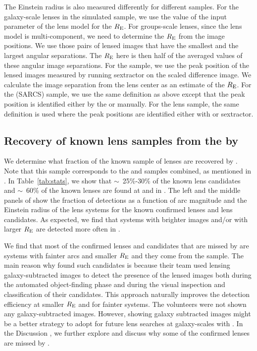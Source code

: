 \documentclass[useAMS,usenatbib,a4paper]{mn2e}
\begin{document}
The Einstein radius is also measured differently for
different samples. For the galaxy-scale lenses in the simulated sample,
we use the value of the input parameter of the lens model for the $R_{\rm E}$.
For groups-scale lenses, since the lens model is multi-component, we
need to determine the $R_{\rm E}$ from the image positions. We use those
pairs of lensed images that have the smallest and the largest angular
separations. The $R_{\rm E}$ here is then half of the averaged values of
these angular image separations. For the \rf sample, we use the peak
position of the lensed images measured by running {\sc sextractor} on
the scaled difference image. We calculate the image separation from the
lens center as an estimate of the $R_{\rm E}$. For the \af (SARCS)
sample, we use the same definition as above except that the peak
position is identified either by the \af or manually. For the \sw lens
sample, the same definition is used where the peak positions are
identified either with \af or {\sc sextractor}.



\subsection{Recovery of known lens samples from the \cfhtls by \sw}
\label{sec:results:known}

We determine what fraction of the known sample of lenses are recovered
by \sw. Note that this sample corresponds to the \rf and \af samples
combined, as mentioned in . In Table~\ref{tab:stats},
we show that $\sim$~25\%-30\% of the known lens candidates and
$\sim$~60\% of the known lenses are found at \StageOne and \StageTwo in
\sw. The left and the middle panels of  show the
fraction of detections as a function of arc magnitude and the Einstein
radius of the lens systems for the known confirmed lenses and lens
candidates. As expected, we find that systems with brighter images
and/or with larger $R_{\rm E}$ are detected more often in \sw.

We find that most of the confirmed lenses and candidates that are missed
by \sw are systems with fainter arcs and smaller $R_{\rm E}$ and they
come from the \rf sample. The main reason why \rf found such candidates
is because their team used lensing galaxy-subtracted images to detect
the presence of the lensed images both during the automated
object-finding phase and during the visual inspection and classification
of their candidates. This approach naturally improves the detection
efficiency at smaller $R_{\rm E}$ and for fainter systems. The \sw
volunteers were not shown any galaxy-subtracted images. However, showing
galaxy subtracted images might be a better strategy to adopt for future
lens searches at galaxy-scales with \sw. In the Discussion
, we further explore and discuss why some of the confirmed
lenses are missed by \sw.
\end{document}
